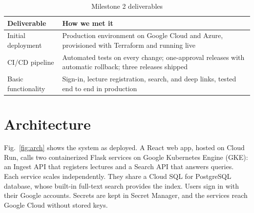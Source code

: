 \documentclass[conference]{IEEEtran}
\begin{document}
\begin{table}[!t]
\caption{Milestone 2 deliverables}
\label{tab:summary}
\centering\small
\begin{tabularx}{\columnwidth}{@{}lX@{}}
\toprule
Deliverable & How we met it \\
\midrule
Initial deployment & Production environment on Google Cloud and Azure, provisioned with Terraform and running live \\
CI/CD pipeline & Automated tests on every change; one-approval releases with automatic rollback; three releases shipped \\
Basic functionality & Sign-in, lecture registration, search, and deep links, tested end to end in production \\
\bottomrule
\end{tabularx}
\end{table}

\section{Architecture}
Fig.~\ref{fig:arch} shows the system as deployed. A React web app, hosted
on Cloud Run, calls two containerized Flask services on Google Kubernetes
Engine (GKE): an Ingest API that registers lectures and a Search API that
answers queries. Each service scales independently. They share a Cloud SQL
for PostgreSQL database, whose built-in full-text search provides the index.
Users sign in with their Google accounts. Secrets are kept in Secret
Manager, and the services reach Google Cloud without stored keys.
\end{document}
